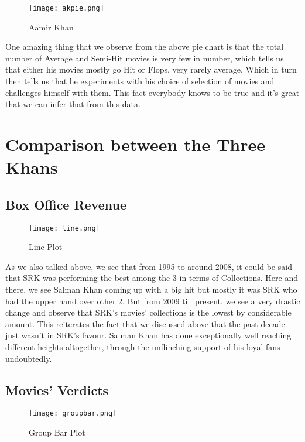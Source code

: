 \documentclass[12pt]{article}
\begin{document}
\begin{figure}[h]
    \texttt{[image: akpie.png]}
    \caption{Aamir Khan}
    \label{fig:Verdict}
\end{figure}

One amazing thing that we observe from the above pie chart is that the total number of Average and Semi-Hit movies is very few in number, which tells us that either his movies mostly go Hit or Flops, very rarely average. Which in turn then tells us that he experiments with his choice of selection of movies and challenges himself with them. This fact everybody knows to be true and it's great that we can infer that from this data.  
\clearpage

\section{Comparison between the Three Khans}

\subsection{Box Office Revenue}
\begin{figure}[h]
    \texttt{[image: line.png]}
    \caption{Line Plot}
    \label{fig:Verdict}
\end{figure}
As we also talked above, we see that from 1995 to around 2008, it could be said that SRK was performing the best among the 3 in terms of Collections. Here and there, we see Salman Khan coming up with a big hit but mostly it was SRK who had the upper hand over other 2. 
\newline
\newline
But from 2009 till present, we see a very drastic change and observe that SRK's movies' collections is the lowest by considerable amount. This reiterates the fact that we discussed above that the past decade just wasn't in SRK's favour. 
\newline
Salman Khan has done exceptionally well reaching different heights altogether, through the unflinching support of his loyal fans undoubtedly.  
\clearpage

\subsection{Movies' Verdicts}
\begin{figure}[h]
    \texttt{[image: groupbar.png]}
    \caption{Group Bar Plot}
    \label{fig:Verdict}
\end{figure}
\end{document}
